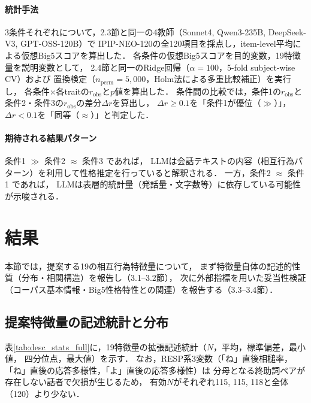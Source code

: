 \documentclass[dvipdfmx,11pt,a4paper]{bxjsarticle}
\renewcommand{\_}{\paperorigunderscore\allowbreak}%
\begin{document}
\paragraph{統計手法}
3条件それぞれについて，2.3節と同一の4教師（Sonnet4, Qwen3-235B, DeepSeek-V3, GPT-OSS-120B）で
IPIP-NEO-120の全120項目を採点し，item-level平均による仮想Big5スコアを算出した．
各条件の仮想Big5スコアを目的変数，19特徴量を説明変数として，
2.4節と同一のRidge回帰（$\alpha = 100$，5-fold subject-wise CV）および
置換検定（$n_{\text{perm}} = 5{,}000$，Holm法による多重比較補正）を実行し，
各条件$\times$各traitの$r_{\text{obs}}$と$p$値を算出した．
\begingroup\sloppy
条件間の比較では，条件1の$r_{\text{obs}}$と条件2・条件3の$r_{\text{obs}}$の差分$\Delta r$を算出し，
$\Delta r \geq 0.1$を「条件1が優位（$\gg$）」，$\Delta r < 0.1$を「同等（$\approx$）」と判定した．

\paragraph{期待される結果パターン}
条件1 $\gg$ 条件2 $\approx$ 条件3 であれば，
LLMは会話テキストの内容（相互行為パターン）を利用して性格推定を行っていると解釈される．
一方，条件2 $\approx$ 条件1 であれば，
LLMは表層的統計量（発話量・文字数等）に依存している可能性が示唆される．
\par\endgroup

\section{結果}

本節では，提案する19の相互行為特徴量について，
まず特徴量自体の記述的性質（分布・相関構造）を報告し（3.1--3.2節），
次に外部指標を用いた妥当性検証（コーパス基本情報・Big5性格特性との関連）を報告する（3.3--3.4節）．

\subsection{提案特徴量の記述統計と分布}
\label{sec:result_descriptive}

表\ref{tab:desc_stats_full}に，19特徴量の拡張記述統計（$N$，平均，標準偏差，最小値，
四分位点，最大値）を示す．
なお，RESP系3変数（「ね」直後相槌率，「ね」直後の応答多様性，「よ」直後の応答多様性）は
分母となる終助詞ペアが存在しない話者で欠損が生じるため，
有効$N$がそれぞれ115, 115, 118と全体（120）より少ない．
\end{document}
